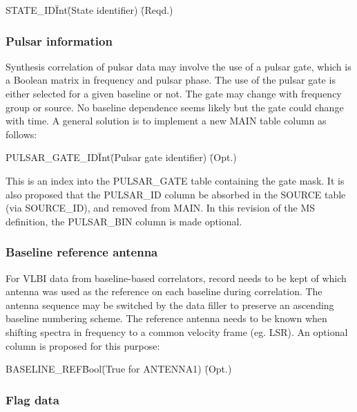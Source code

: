 \documentclass{article}
\begin{document}
\begin{tabbing}
STATE\_ID\quad\quad \= Int\quad\quad \= (State identifier)
 \quad\quad \= (Reqd.) \\
\end{tabbing} 


\subsubsection{Pulsar information}

Synthesis correlation of pulsar data may involve the use of a pulsar gate,
which is a Boolean matrix in frequency and pulsar phase. The use of the
pulsar gate is either selected for a given baseline or not. The gate
may change with frequency group or source. No baseline dependence
seems likely but the gate could change with time. A general solution
is to implement a new MAIN table column as follows:

\begin{tabbing}
PULSAR\_GATE\_ID\quad\quad \= Int\quad\quad \= (Pulsar gate identifier)
 \quad\quad \= (Opt.) \\
\end{tabbing}

This is an index into the PULSAR\_GATE table containing the gate mask.
It is also proposed that the PULSAR\_ID column be absorbed in the
SOURCE table (via SOURCE\_ID), and removed from MAIN.  In this
revision of the MS definition, the PULSAR\_BIN column is made
optional.

\subsubsection{Baseline reference antenna}

For VLBI data from baseline-based correlators, record needs to be kept
of which antenna was used as the reference on each baseline during
correlation. The antenna sequence may be switched by the data filler
to preserve an ascending baseline numbering scheme. The reference
antenna needs to be known when shifting spectra in frequency to a
common velocity frame (eg. LSR). An optional column is proposed for
this purpose:

\begin{tabbing}
BASELINE\_REF\quad\quad \= Bool\quad\quad \= (True for ANTENNA1)
 \quad\quad \= (Opt.) \\
\end{tabbing}

\subsubsection{Flag data}
\end{document}
